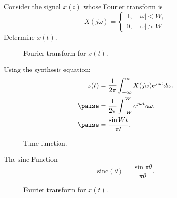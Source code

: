 \begin{frame}
    \begin{example}
        Consider the signal $x(t)$ whose Fourier transform is
        \begin{equation*}
            X(j\omega) = \begin{cases}
                1,& |\omega| < W,\\
                0, & |\omega| > W.
            \end{cases}
        \end{equation*}
        Determine $x(t)$.
        \begin{figure}
          \centering
          
          \caption{Fourier transform for $x(t)$.}\label{fi:xomega_square}
        \end{figure}
    \end{example}
    \pause
    {

    }
\end{frame}



\begin{frame}[plain]
    {

        Using the synthesis equation:
        \begin{equation*}
            \begin{aligned}
                x(t) &= \frac{1}{2\pi}\int_{-\infty}^{\infty}X(j\omega)e^{j\omega t} d\omega.\\ \pause
                &= \frac{1}{2\pi}\int_{-W}^{W}e^{j\omega t} d\omega.\\ \pause
                &= \frac{\sin W t}{\pi t}.\\
            \end{aligned}
        \end{equation*}
        \pause
        \begin{figure}
          \centering
          
          \caption{Time function.}\label{fi:rectift}
        \end{figure}
    }
\end{frame}



\begin{frame}{The $\mathrm{sinc}$ Function}
    \begin{equation}\label{eq:sinc_function}
        \mathrm{sinc}(\theta) = \frac{\sin \pi \theta}{\pi \theta}.
    \end{equation}
    \begin{figure}
      \centering
      
      \caption{Fourier transform for $x(t)$.}\label{fi:sinc_function}
    \end{figure}
\end{frame}


